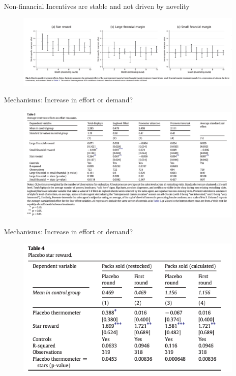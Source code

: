 \documentclass{beamer}
\begin{document}
\begin{frame}{Non-financial Incentives are stable and not driven by novelity}
    \begin{figure}
        \centering
        \includegraphics[width=\textwidth]{F4.png}
        \label{fig:my_label}
    \end{figure}
\end{frame}

\begin{frame}{Mechanisms: Increase in effort or demand?}
    \begin{figure}
        \centering
        \includegraphics[width=\textwidth]{T3.png}
        \label{fig:my_label}
    \end{figure}
\end{frame}

\begin{frame}{Mechanisms: Increase in effort or demand?}
    \begin{figure}
        \centering
        \includegraphics[width=\textwidth]{T4.png}
        \label{fig:my_label}
    \end{figure}
\end{frame}
\end{document}
